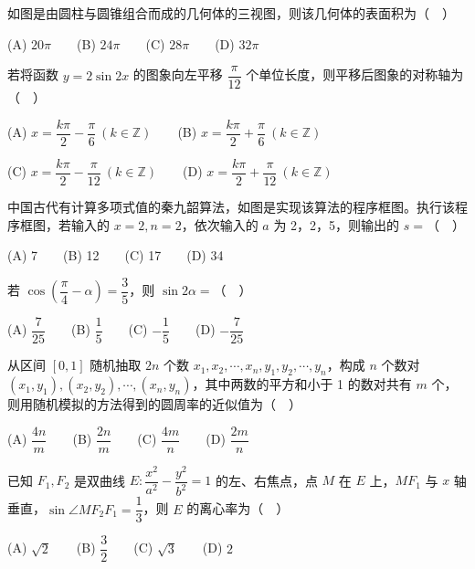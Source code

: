 \begin{question}
如图是由圆柱与圆锥组合而成的几何体的三视图，则该几何体的表面积为（　）
\nopagebreak[4]
\begin{center}\end{center}
\nopagebreak[4]
   (A) \(20\pi\)　　(B) \(24\pi\)　　(C) \(28\pi\)　　(D) \(32\pi\)

\end{question}
\begin{question}
若将函数 \(y=2\sin 2x\) 的图象向左平移 \(\dfrac{\pi}{12}\) 个单位长度，则平移后图象的对称轴为（　）

   (A) \(x=\dfrac{k\pi}{2}-\dfrac{\pi}{6}\ (k\in\mathbb Z)\)　　(B) \(x=\dfrac{k\pi}{2}+\dfrac{\pi}{6}\ (k\in\mathbb Z)\)

   (C) \(x=\dfrac{k\pi}{2}-\dfrac{\pi}{12}\ (k\in\mathbb Z)\)　　(D) \(x=\dfrac{k\pi}{2}+\dfrac{\pi}{12}\ (k\in\mathbb Z)\)

\Needspace{0.4\textheight}
\end{question}
\begin{question}
中国古代有计算多项式值的秦九韶算法，如图是实现该算法的程序框图。执行该程序框图，若输入的 \(x=2,n=2\)，依次输入的 \(a\) 为 2，2，5，则输出的 \(s=\)（　）
\nopagebreak[4]
\begin{center}\end{center}
\nopagebreak[4]
   (A) 7　　(B) 12　　(C) 17　　(D) 34

\end{question}
\begin{question}
若 \(\cos\left(\dfrac\pi4-\alpha\right)=\dfrac35\)，则 \(\sin 2\alpha=\)（　）

   (A) \(\dfrac7{25}\)　　(B) \(\dfrac15\)　　(C) \(-\dfrac15\)　　(D) \(-\dfrac7{25}\)

\end{question}
\begin{question}
从区间 \([0,1]\) 随机抽取 \(2n\) 个数 \(x_1,x_2,\cdots,x_n,y_1,y_2,\cdots,y_n\)，构成 \(n\) 个数对 \((x_1,y_1),(x_2,y_2),\cdots,(x_n,y_n)\)，其中两数的平方和小于 1 的数对共有 \(m\) 个，则用随机模拟的方法得到的圆周率的近似值为（　）

   (A) \(\dfrac{4n}{m}\)　　(B) \(\dfrac{2n}{m}\)　　(C) \(\dfrac{4m}{n}\)　　(D) \(\dfrac{2m}{n}\)

\end{question}
\begin{question}
已知 \(F_1,F_2\) 是双曲线 \(E:\dfrac{x^2}{a^2}-\dfrac{y^2}{b^2}=1\) 的左、右焦点，点 \(M\) 在 \(E\) 上，\(MF_1\) 与 \(x\) 轴垂直，\(\sin\angle MF_2F_1=\dfrac13\)，则 \(E\) 的离心率为（　）

   (A) \(\sqrt2\)　　(B) \(\dfrac32\)　　(C) \(\sqrt3\)　　(D) \(2\)

\end{question}
